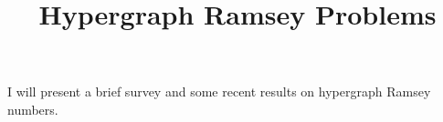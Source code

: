\title{Hypergraph Ramsey Problems}
\endtitle

I will present a brief survey and some recent results on hypergraph Ramsey numbers.
